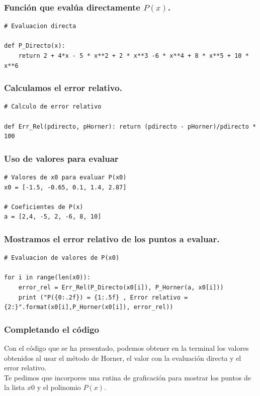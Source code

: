 \documentclass[12pt]{beamer}
\begin{document}
\begin{frame}[fragile]
\frametitle{Función que evalúa directamente $P(x)$.}
\fontsize{14}{14}\selectfont
\begin{lstlisting}[caption=Evaluación directa de la función]
# Evaluacion directa

def P_Directo(x):
    return 2 + 4*x - 5 * x**2 + 2 * x**3 -6 * x**4 + 8 * x**5 + 10 * x**6
\end{lstlisting}
\end{frame}
\begin{frame}[fragile]
\frametitle{Calculamos el error relativo.}
\begin{lstlisting}[caption=Evaluación del error relativo]
# Calculo de error relativo

def Err_Rel(pdirecto, pHorner): return (pdirecto - pHorner)/pdirecto * 100
\end{lstlisting}
\end{frame}
\begin{frame}[fragile]
\frametitle{Uso de valores para evaluar}
\begin{lstlisting}[caption=Valores para evaluar]
# Valores de x0 para evaluar P(x0)
x0 = [-1.5, -0.65, 0.1, 1.4, 2.87]

# Coeficientes de P(x)
a = [2,4, -5, 2, -6, 8, 10]
\end{lstlisting}
\end{frame}
\begin{frame}[fragile]
\frametitle{Mostramos el error relativo de los puntos a evaluar.}
\fontsize{14}{14}\selectfont
\begin{lstlisting}[caption=Error relativo calculado]
# Evaluacion de valores de P(x0)

for i in range(len(x0)):
	error_rel = Err_Rel(P_Directo(x0[i]), P_Horner(a, x0[i]))
    print ("P({0:.2f}) = {1:.5f} , Error relativo = {2:}".format(x0[i],P_Horner(x0[i]), error_rel)) 
\end{lstlisting}
\end{frame}
\begin{frame}[fragile]
\frametitle{Completando el código}
Con el código que se ha presentado, podemos obtener en la terminal los valores obtenidos al usar el método de Horner, el valor con la evaluación directa y el error relativo.
\\
\bigskip
\pause
Te pedimos que incorpores una rutina de graficación para mostrar los puntos de la lista $x0$ y el polinomio $P(x)$.
\end{frame}
\end{document}
